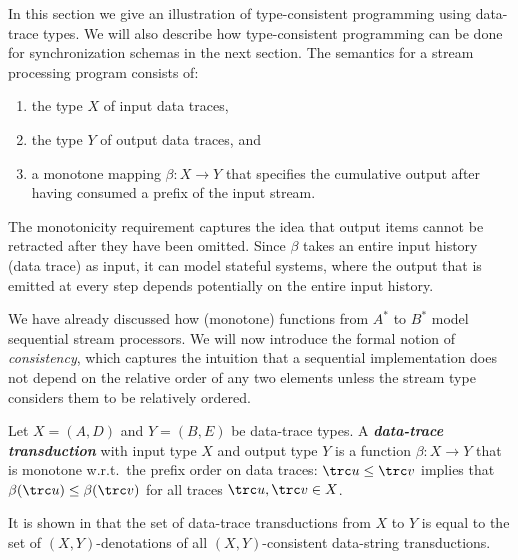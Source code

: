 In this section we give an illustration of type-consistent programming
using data-trace types.
We will also describe how type-consistent programming can be done for
synchronization schemas in the next section.
The semantics for a stream processing program consists of:
\begin{enumerate}
\item
the type $X$ of input data traces,
\item
the type $Y$ of output data traces, and
\item
a monotone mapping $\beta: X \to Y$ that specifies the cumulative output after having consumed a prefix of the input stream.
\end{enumerate}
The monotonicity requirement captures the idea that output items cannot be retracted after they have been omitted. Since $\beta$ takes an entire input history (data trace) as input, it can model stateful systems, where the output that is emitted at every step depends potentially on the entire input history.

We have already discussed how (monotone) functions from $A^*$ to $B^*$ model sequential stream processors. We will now introduce the formal notion of \emph{consistency}, which captures the intuition that a sequential implementation does not depend on the relative order of any two elements unless the stream type considers them to be relatively ordered.


\begin{definition}
Let $X = (A,D)$ and $Y = (B,E)$ be data-trace types. A \textbf{\em data-trace transduction} with input type $X$ and output type $Y$ is a function $\beta: X \to Y$ that is monotone w.r.t.\ the prefix order on data traces: $\trc u \leq \trc v$ implies that $\beta(\trc u) \leq \beta(\trc v)$ for all traces $\trc u, \trc v \in X$.
\end{definition}

It is shown in  that the set of data-trace transductions from $X$ to $Y$ is equal to the set of $(X,Y)$-denotations of all $(X,Y)$-consistent data-string transductions.


